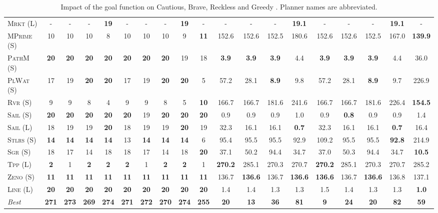 \begin{table}[tb]
{\begin{tabular}{|l||ccccccccc||ccccccccc||}
\textsc{Mrkt} (L)&-&-&-&\textbf{19}&-&-&-&\textbf{19}&-&-&-&-&\textbf{19.1}&-&-&-&\textbf{19.1}&-\\
\textsc{MPrime} (S)&10&10&10&8&10&10&10&9&\textbf{11}&152.6&152.6&152.5&180.6&152.6&152.6&152.5&167.0&\textbf{139.9}\\
\textsc{PathM} (S)&\textbf{20}&\textbf{20}&\textbf{20}&\textbf{20}&\textbf{20}&\textbf{20}&\textbf{20}&19&18&\textbf{3.9}&\textbf{3.9}&\textbf{3.9}&4.4&\textbf{3.9}&\textbf{3.9}&\textbf{3.9}&4.4&36.0\\
\textsc{PlWat} (S)&17&19&\textbf{20}&\textbf{20}&17&19&\textbf{20}&\textbf{20}&5&57.2&28.1&\textbf{8.9}&9.8&57.2&28.1&\textbf{8.9}&9.7&226.9\\
\textsc{Rvr} (S)&9&9&8&4&9&9&8&5&\textbf{10}&166.7&166.7&181.6&241.6&166.7&166.7&181.6&226.4&\textbf{154.5}\\
\textsc{Sail} (S)&\textbf{20}&\textbf{20}&\textbf{20}&\textbf{20}&\textbf{20}&19&\textbf{20}&\textbf{20}&\textbf{20}&0.9&0.9&0.9&1.0&0.9&\textbf{0.8}&0.9&0.9&1.4\\
\textsc{Sail} (L)&18&19&19&\textbf{20}&18&19&19&\textbf{20}&19&32.3&16.1&16.1&\textbf{0.7}&32.3&16.1&16.1&\textbf{0.7}&16.4\\
\textsc{Stlrs} (S)&\textbf{14}&\textbf{14}&\textbf{14}&\textbf{14}&13&\textbf{14}&\textbf{14}&\textbf{14}&6&95.4&95.5&95.5&92.9&109.2&95.5&95.5&\textbf{92.8}&214.9\\
\textsc{Sgr} (S)&18&17&14&18&18&17&14&18&\textbf{20}&37.1&50.2&94.4&34.7&37.0&50.3&94.4&34.7&\textbf{10.5}\\
\textsc{Tpp} (L)&\textbf{2}&1&\textbf{2}&\textbf{2}&\textbf{2}&1&\textbf{2}&\textbf{2}&1&\textbf{270.2}&285.1&270.3&270.7&\textbf{270.2}&285.1&270.3&270.7&285.2\\
\textsc{Zeno} (S)&\textbf{11}&\textbf{11}&\textbf{11}&\textbf{11}&\textbf{11}&\textbf{11}&\textbf{11}&\textbf{11}&\textbf{11}&136.7&\textbf{136.6}&136.7&\textbf{136.6}&\textbf{136.6}&136.7&\textbf{136.6}&136.8&137.1\\
\textsc{Line} (L)&\textbf{20}&\textbf{20}&\textbf{20}&\textbf{20}&\textbf{20}&\textbf{20}&\textbf{20}&\textbf{20}&\textbf{20}&1.4&1.4&1.3&1.3&1.5&1.4&1.3&1.3&\textbf{1.0}
\\\hline
\textit{Best}&\textbf{271}&\textbf{273}&\textbf{269}&\textbf{274}&\textbf{271}&\textbf{272}&\textbf{270}&\textbf{274}&\textbf{255}&\textbf{20}&\textbf{13}&\textbf{36}&\textbf{81}&\textbf{9}&\textbf{24}&\textbf{20}&\textbf{82}&\textbf{59}\\\hline

        \end{tabular}}
        \caption{Impact of the goal function on Cautious, Brave, Reckless and Greedy \pattyd. Planner names are abbreviated.}
        \label{tab:abl-gf}
        \end{table}
        